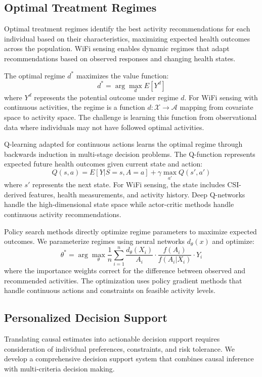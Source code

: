\documentclass[journal]{IEEEtran}
\begin{document}
\subsection{Optimal Treatment Regimes}

Optimal treatment regimes identify the best activity recommendations for each individual based on their characteristics, maximizing expected health outcomes across the population. WiFi sensing enables dynamic regimes that adapt recommendations based on observed responses and changing health states.

The optimal regime $d^*$ maximizes the value function:
$$d^* = \arg\max_d E[Y^d]$$
where $Y^d$ represents the potential outcome under regime $d$. For WiFi sensing with continuous activities, the regime is a function $d: \mathcal{X} \rightarrow \mathcal{A}$ mapping from covariate space to activity space. The challenge is learning this function from observational data where individuals may not have followed optimal activities.

Q-learning adapted for continuous actions learns the optimal regime through backwards induction in multi-stage decision problems. The Q-function represents expected future health outcomes given current state and action:
$$Q(s, a) = E[Y | S = s, A = a] + \gamma \max_{a'} Q(s', a')$$
where $s'$ represents the next state. For WiFi sensing, the state includes CSI-derived features, health measurements, and activity history. Deep Q-networks handle the high-dimensional state space while actor-critic methods handle continuous activity recommendations.

Policy search methods directly optimize regime parameters to maximize expected outcomes. We parameterize regimes using neural networks $d_\theta(x)$ and optimize:
$$\theta^* = \arg\max_\theta \frac{1}{n} \sum_{i=1}^n \frac{d_\theta(X_i)}{A_i} \cdot \frac{f(A_i)}{f(A_i|X_i)} \cdot Y_i$$
where the importance weights correct for the difference between observed and recommended activities. The optimization uses policy gradient methods that handle continuous actions and constraints on feasible activity levels.

\subsection{Personalized Decision Support}

Translating causal estimates into actionable decision support requires consideration of individual preferences, constraints, and risk tolerance. We develop a comprehensive decision support system that combines causal inference with multi-criteria decision making.
\end{document}
